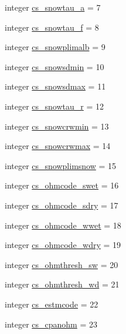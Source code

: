 \begin{DoxyCompactItemize}
integer \hyperlink{namespacecolnamesinputfiles_aea5e42e1d69a641bb42d77a33d715624}{cs\+\_\+snowtau\+\_\+a} = 7
\item 
integer \hyperlink{namespacecolnamesinputfiles_a9c63b9dd71fdf3284587e06e17216808}{cs\+\_\+snowtau\+\_\+f} = 8
\item 
integer \hyperlink{namespacecolnamesinputfiles_a4d946b1a7c6e10bb47990af08034d91d}{cs\+\_\+snowplimalb} = 9
\item 
integer \hyperlink{namespacecolnamesinputfiles_a527f1adfa8ec04c88f77c6331a0fa3e3}{cs\+\_\+snowsdmin} = 10
\item 
integer \hyperlink{namespacecolnamesinputfiles_a0d7e04ea2aa9c4c1942bec1b07aa8c2b}{cs\+\_\+snowsdmax} = 11
\item 
integer \hyperlink{namespacecolnamesinputfiles_a499961ef44ea0d56e53b8b62d78b4c54}{cs\+\_\+snowtau\+\_\+r} = 12
\item 
integer \hyperlink{namespacecolnamesinputfiles_a4ed5aa735a6c288a3fee77c1acdac986}{cs\+\_\+snowcrwmin} = 13
\item 
integer \hyperlink{namespacecolnamesinputfiles_ad582e1a28ee160f5284d28f4e812b789}{cs\+\_\+snowcrwmax} = 14
\item 
integer \hyperlink{namespacecolnamesinputfiles_a43f09364a800feba853b60bf242eb294}{cs\+\_\+snowplimsnow} = 15
\item 
integer \hyperlink{namespacecolnamesinputfiles_af52bb9fada406f3a3df73885970550a3}{cs\+\_\+ohmcode\+\_\+swet} = 16
\item 
integer \hyperlink{namespacecolnamesinputfiles_aac0a74a601839badabaea7de54b70a14}{cs\+\_\+ohmcode\+\_\+sdry} = 17
\item 
integer \hyperlink{namespacecolnamesinputfiles_adc4f1ba02ae2dca54b27ca13a5b3f09c}{cs\+\_\+ohmcode\+\_\+wwet} = 18
\item 
integer \hyperlink{namespacecolnamesinputfiles_ac9094a91e567542360bcf0cc0c082a7e}{cs\+\_\+ohmcode\+\_\+wdry} = 19
\item 
integer \hyperlink{namespacecolnamesinputfiles_a3ab24828e348ec0efcec26ea92db540f}{cs\+\_\+ohmthresh\+\_\+sw} = 20
\item 
integer \hyperlink{namespacecolnamesinputfiles_a1ade5e515336fe9240bf46c18760cc8b}{cs\+\_\+ohmthresh\+\_\+wd} = 21
\item 
integer \hyperlink{namespacecolnamesinputfiles_a9ec8d7169edb6eb99d629d83b0fd180f}{cs\+\_\+estmcode} = 22
\item 
integer \hyperlink{namespacecolnamesinputfiles_a703943b50c9fca1069fb4bf8dc1a1938}{cs\+\_\+cpanohm} = 23

\end{DoxyCompactItemize}
